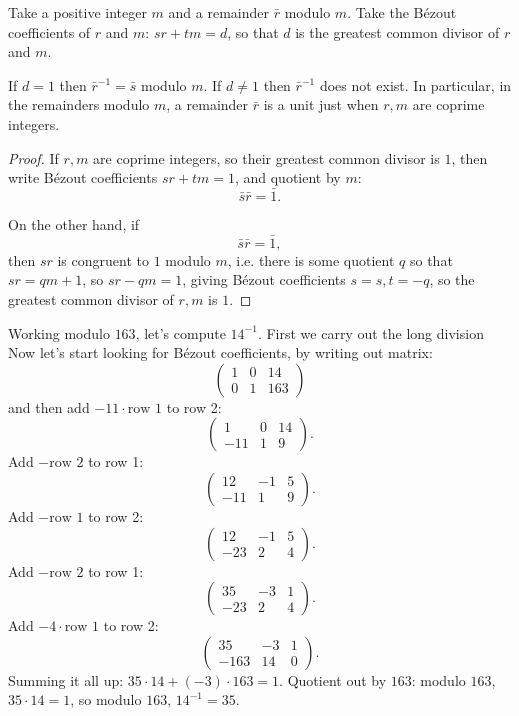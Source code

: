 \begin{theorem}
Take a positive integer \(m\) and a remainder \(\bar{r}\) modulo \(m\).
Take the B\'ezout coefficients of \(r\) and \(m\): \(sr+tm=d\), so that \(d\) is the greatest common divisor of \(r\) and \(m\).

If \(d=1\) then \(\bar{r}^{-1}=\bar{s}\) modulo \(m\).
If \(d \ne 1\) then \(\bar{r}^{-1}\) does not exist.
In particular, in the remainders modulo \(m\), a remainder \(\bar{r}\) is a unit just when \(r,m\) are coprime integers.
\end{theorem}
\begin{proof}
If \(r,m\) are coprime integers, so their greatest common divisor is \(1\), then write B\'ezout coefficients \(sr+tm=1\), and quotient by \(m\):
\[
\bar{s}\bar{r}=\bar{1}.
\]

On the other hand, if 
\[
\bar{s}\bar{r}=\bar{1},
\]
then \(sr\) is congruent to \(1\) modulo \(m\), i.e. there is some quotient \(q\) so that \(sr=qm+1\), so \(sr-qm=1\), giving B\'ezout coefficients \(s=s,t=-q\), so the greatest common divisor of \(r,m\) is \(1\).
\end{proof}
\begin{example}
Working modulo \(163\), let's compute \(14^{-1}\).
First we carry out the long division
Now let's start looking for B\'ezout coefficients, by writing out matrix:
\[
\begin{pmatrix}
1 & 0 & 14 \\
0 & 1 & 163
\end{pmatrix}
\]
and then add \(-11\cdot\text{row 1}\) to row 2:
\[
\begin{pmatrix}
1 & 0 & 14 \\
-11 & 1 & 9
\end{pmatrix}.
\]
Add \(-\text{row 2}\) to row 1:
\[
\begin{pmatrix}
12 & -1 & 5 \\
-11 & 1 & 9
\end{pmatrix}.
\]
Add \(-\text{row 1}\) to row 2:
\[
\begin{pmatrix}
12 & -1 & 5 \\
-23 & 2 & 4
\end{pmatrix}.
\]
Add \(-\text{row 2}\) to row 1:
\[
\begin{pmatrix}
35 & -3 & 1 \\
-23 & 2 & 4
\end{pmatrix}.
\]
Add \(-4 \cdot \text{row 1}\) to row 2:
\[
\begin{pmatrix}
35 & -3 & 1 \\
-163 & 14 & 0
\end{pmatrix}.
\]
Summing it all up: \(35 \cdot 14 + (-3) \cdot 163 = 1\).
Quotient out by \(163\): modulo \(163\), \(35 \cdot 14 = 1\), so modulo \(163\), \(14^{-1}=35\).
\end{example}

